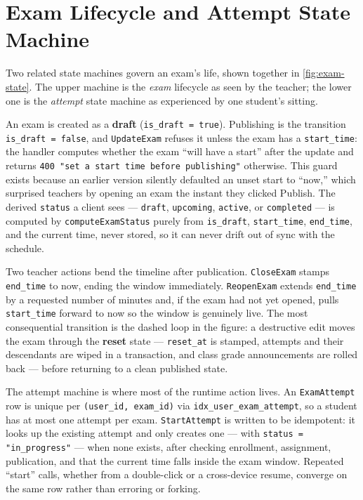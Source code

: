 \section{Exam Lifecycle and Attempt State Machine}

Two related state machines govern an exam's life, shown together in
\cref{fig:exam-state}. The upper machine is the \emph{exam} lifecycle as seen by
the teacher; the lower one is the \emph{attempt} state machine as experienced by
one student's sitting.



An exam is created as a \textbf{draft} (\texttt{is\_draft = true}). Publishing
is the transition \texttt{is\_draft = false}, and \texttt{UpdateExam} refuses it
unless the exam has a \texttt{start\_time}: the handler computes whether the
exam ``will have a start'' after the update and returns
\texttt{400 "set a start time before publishing"} otherwise. This guard exists
because an earlier version silently defaulted an unset start to ``now,'' which
surprised teachers by opening an exam the instant they clicked Publish. The
derived \texttt{status} a client sees --- \texttt{draft}, \texttt{upcoming},
\texttt{active}, or \texttt{completed} --- is computed by
\texttt{computeExamStatus} purely from \texttt{is\_draft}, \texttt{start\_time},
\texttt{end\_time}, and the current time, never stored, so it can never drift
out of sync with the schedule.

Two teacher actions bend the timeline after publication. \texttt{CloseExam}
stamps \texttt{end\_time} to now, ending the window immediately.
\texttt{ReopenExam} extends \texttt{end\_time} by a requested number of minutes
and, if the exam had not yet opened, pulls \texttt{start\_time} forward to now so
the window is genuinely live. The most consequential transition is the dashed
loop in the figure: a destructive edit moves the exam through the \textbf{reset}
state --- \texttt{reset\_at} is stamped, attempts and their descendants are
wiped in a transaction, and class grade announcements are rolled back --- before
returning to a clean published state.

The attempt machine is where most of the runtime action lives. An
\texttt{ExamAttempt} row is unique per \texttt{(user\_id, exam\_id)} via
\texttt{idx\_user\_exam\_attempt}, so a student has at most one attempt per
exam. \texttt{StartAttempt} is written to be idempotent: it looks up the
existing attempt and only creates one --- with \texttt{status = "in\_progress"}
--- when none exists, after checking enrollment, assignment, publication, and
that the current time falls inside the exam window. Repeated ``start'' calls,
whether from a double-click or a cross-device resume, converge on the same row
rather than erroring or forking.


